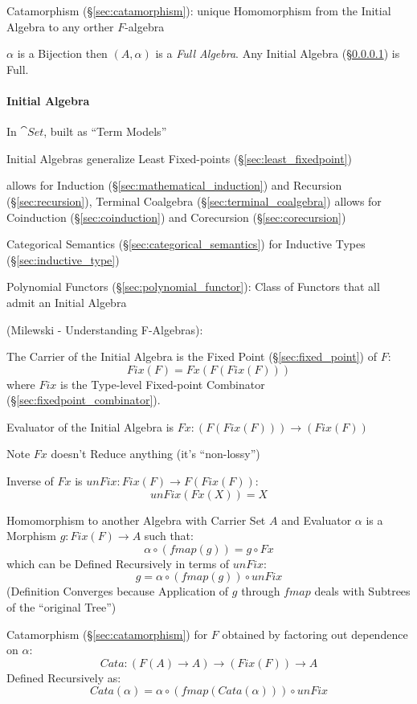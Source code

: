 Catamorphism (\S\ref{sec:catamorphism}): unique Homomorphism from the
Initial Algebra to any orther $F$-algebra

$\alpha$ is a Bijection then $(A,\alpha)$ is a \emph{Full Algebra}.
Any Initial Algebra (\S\ref{sec:initial_algebra}) is Full.
\cite{aczel88}



\paragraph{Initial Algebra}\label{sec:initial_algebra}\hfill

In $\cat{Set}$, built as ``Term Models'' \cite{corfield08} %

Initial Algebras generalize Least Fixed-points
(\S\ref{sec:least_fixedpoint}) \cite{rutten00}

allows for Induction (\S\ref{sec:mathematical_induction}) and
Recursion (\S\ref{sec:recursion}), Terminal Coalgebra
(\S\ref{sec:terminal_coalgebra}) allows for Coinduction
(\S\ref{sec:coinduction}) and Corecursion (\S\ref{sec:corecursion})

Categorical Semantics (\S\ref{sec:categorical_semantics}) for
Inductive Types (\S\ref{sec:inductive_type})

Polynomial Functors (\S\ref{sec:polynomial_functor}): Class of
Functors that all admit an Initial Algebra %

(Milewski - Understanding F-Algebras):

The Carrier of the Initial Algebra is the Fixed Point
(\S\ref{sec:fixed_point}) of $F$:
\[
  Fix (F) = Fx (F (Fix (F)))
\]
where $Fix$ is the Type-level Fixed-point Combinator
(\S\ref{sec:fixedpoint_combinator}).

Evaluator of the Initial Algebra is $Fx : (F (Fix (F))) \rightarrow
(Fix (F))$

\fist Note $Fx$ doesn't Reduce anything (it's ``non-lossy'')

Inverse of $Fx$ is $unFix : Fix (F) \rightarrow F (Fix (F))$:
\[
  unFix (Fx (X)) = X
\]

Homomorphism to another Algebra with Carrier Set $A$ and Evaluator
$\alpha$ is a Morphism $g : Fix (F) \rightarrow A$ such that:
\[
  \alpha \circ (fmap (g)) = g \circ Fx
\]
which can be Defined Recursively in terms of $unFix$:
\[
  g = \alpha \circ (fmap (g)) \circ unFix
\]
(Definition Converges because Application of $g$ through $fmap$ deals
with Subtrees of the ``original Tree'')

Catamorphism (\S\ref{sec:catamorphism}) for $F$ obtained by factoring
out dependence on $\alpha$:
\[
  Cata : (F (A) \rightarrow A) \rightarrow (Fix (F)) \rightarrow A
\]
Defined Recursively as:
\[
  Cata (\alpha) = \alpha \circ (fmap (Cata (\alpha))) \circ unFix
\]

